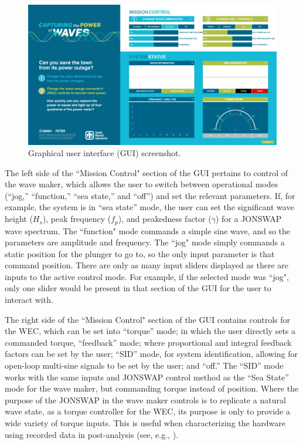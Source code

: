 \documentclass[hardware,article,submit,pdftex,moreauthors]{Definitions/mdpi}
\begin{document}
\begin{figure}[tb]
  \centering
  \includegraphics[width=1\textwidth]{diagrams/siweed_guiScreenShot.png}
  \caption{Graphical user interface (GUI) screenshot.}
  \label{fig:siweed_guiScreenShot}
\end{figure}

The left side of the ``Mission Control" section of the GUI pertains to control of the wave maker, which allows the user to switch between operational modes (``jog,'' ``function,'' ``sea state,'' and ``off'') and set the relevant parameters.
If, for example, the system is in ``sea state'' mode, the user can set the significant wave height ($H_s$), peak frequency ($f_p$), and peakedness factor ($\gamma$) for a JONSWAP wave spectrum.
The ``function" mode commands a simple sine wave, and so the parameters are amplitude and frequency. 
The ``jog" mode simply commands a static position for the plunger to go to, so the only input parameter is that command position.
There are only as many input sliders displayed as there are inputs to the active control mode. 
For example, if the selected mode was ``jog", only one slider would be present in that section of the GUI for the user to interact with.

The right side of the ``Mission Control" section of the GUI  contains controls for the WEC, which can be set into ``torque'' mode; in which the user directly sets a commanded torque, ``feedback'' mode; where proportional and integral feedback factors can be set by the user; ``SID'' mode, for system identification, allowing for open-loop multi-sine signals to be set by the user; and ``off.''
The ``SID'' mode works with the same inputs and JONSWAP control method as the ``Sea State'' mode for the wave maker, but commanding torque instead of position.
Where the purpose of the JONSWAP in the wave maker controls is to replicate a natural wave state, as a torque controller for the WEC, its purpose is only to provide a wide variety of torque inputs. 
This is useful when characterizing the hardware using recorded data in post-analysis (see, e.g., \cite{Bacelli2017a}).
\end{document}
